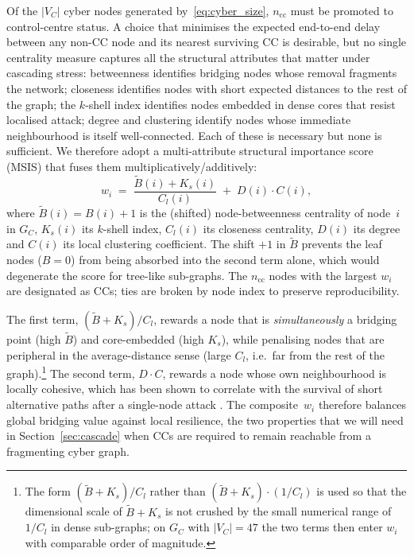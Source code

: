 Of the $|V_C|$ cyber nodes generated by~\eqref{eq:cyber_size},
$n_{\text{cc}}$ must be promoted to control-centre status.  A choice
that minimises the expected end-to-end delay between any non-CC node
and its nearest surviving CC is desirable, but no single centrality
measure captures all the structural attributes that matter under
cascading stress: betweenness identifies bridging nodes whose removal
fragments the network; closeness identifies nodes with short
expected distances to the rest of the graph; the $k$-shell index
identifies nodes embedded in dense cores that resist localised
attack; degree and clustering identify nodes whose immediate
neighbourhood is itself well-connected.  Each of these is necessary
but none is sufficient.  We therefore adopt a multi-attribute
structural importance score (MSIS) that fuses them
multiplicatively/additively:
\begin{equation}\label{eq:msis}
  w_i \;=\; \frac{\widetilde{B}(i)+K_s(i)}{C_l(i)} \;+\; D(i)\cdot C(i),
\end{equation}
where $\widetilde{B}(i)=B(i)+1$ is the (shifted) node-betweenness
centrality of node~$i$ in $G_C$, $K_s(i)$ its $k$-shell index,
$C_l(i)$ its closeness centrality, $D(i)$ its degree and $C(i)$ its
local clustering coefficient.  The shift $+1$ in $\widetilde{B}$
prevents the leaf nodes ($B=0$) from being absorbed into the second
term alone, which would degenerate the score for tree-like
sub-graphs.  The $n_{\text{cc}}$ nodes with the largest $w_i$ are
designated as CCs; ties are broken by node index to preserve
reproducibility.

The first term, $(\widetilde{B}+K_s)/C_l$, rewards a node that is
\emph{simultaneously} a bridging point (high $\widetilde{B}$) and
core-embedded (high $K_s$), while penalising nodes that are
peripheral in the average-distance sense (large $C_l$, i.e.\ far from
the rest of the graph).\footnote{The form
$(\widetilde{B}+K_s)/C_l$ rather than $(\widetilde{B}+K_s)\cdot
(1/C_l)$ is used so that the dimensional scale of $\widetilde{B}+K_s$
is not crushed by the small numerical range of $1/C_l$ in dense
sub-graphs; on $G_C$ with $|V_C|=47$ the two terms then enter
$w_i$ with comparable order of magnitude.}  The second term,
$D\cdot C$, rewards a node whose own neighbourhood is locally
cohesive, which has been shown to correlate with the survival of
short alternative paths after a single-node attack
\citep{Fortunato2010,Schneider2011}.  The composite~$w_i$ therefore
balances global bridging value against local resilience, the two
properties that we will need in Section~\ref{sec:cascade} when CCs
are required to remain reachable from a fragmenting cyber graph.

